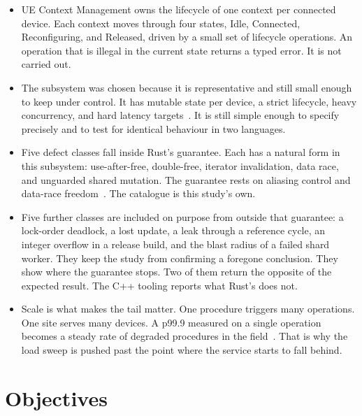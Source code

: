 \documentclass[english,twoside,openright,a4paper,censored,csm,software-track-2020]{HYthesisML}
\begin{document}
\begin{itemize}
  \item UE Context Management owns the lifecycle of one context per connected device. Each
        context moves through four states, Idle, Connected, Reconfiguring, and Released, driven
        by a small set of lifecycle operations. An operation that is illegal in the current
        state returns a typed error. It is not carried out.
  \item The subsystem was chosen because it is representative and still small enough to keep
        under control. It has mutable state per device, a strict lifecycle, heavy concurrency,
        and hard latency targets~\cite{3gpp38913,3gpp22261}. It is still simple enough to specify
        precisely and to test for identical behaviour in two languages.
  \item Five defect classes fall inside Rust's guarantee. Each has a natural form in this
        subsystem: use-after-free, double-free, iterator invalidation, data race, and unguarded
        shared mutation. The guarantee rests on aliasing control and data-race
        freedom~\cite{jung2021safe}. The catalogue is this study's own.
  \item Five further classes are included on purpose from outside that guarantee: a lock-order
        deadlock, a lost update, a leak through a reference cycle, an integer overflow in a
        release build, and the blast radius of a failed shard worker. They keep the study from
        confirming a foregone conclusion. They show where the guarantee stops. Two of them return
        the opposite of the expected result. The C++ tooling reports what Rust's does not.
  \item Scale is what makes the tail matter. One procedure triggers many operations. One site
        serves many devices. A p99.9 measured on a single operation becomes a steady rate of
        degraded procedures in the field~\cite{dean2013tail}. That is why the load sweep is
        pushed past the point where the service starts to fall behind.
\end{itemize}

\chapter{Objectives\label{chapter:objectives}}
\end{document}
